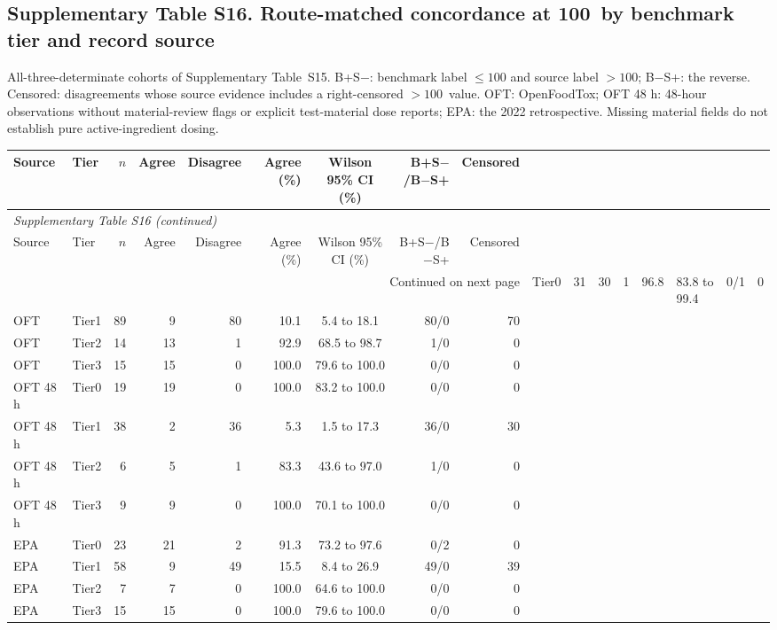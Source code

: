 \subsection*{Supplementary Table S16. Route-matched concordance at 100~\ugbee by benchmark tier and record source}

All-three-determinate cohorts of Supplementary Table~S15. B+S$-$: benchmark label $\leq100$ and source label $>100$; B$-$S+: the reverse. Censored: disagreements whose source evidence includes a right-censored $>100$~\ugbee value. OFT: OpenFoodTox; OFT 48 h: 48-hour observations without material-review flags or explicit test-material dose reports; EPA: the 2022 retrospective. Missing material fields do not establish pure active-ingredient dosing.

\begingroup\footnotesize\setlength{\tabcolsep}{3pt}

\begin{longtable}{llrrrrcrr}

\toprule Source & Tier & $n$ & Agree & Disagree & Agree (\%) & Wilson 95\% CI (\%) & B+S$-$/B$-$S+ & Censored \\ \midrule\endfirsthead

\multicolumn{9}{l}{\textit{Supplementary Table S16 (continued)}} \\

\toprule Source & Tier & $n$ & Agree & Disagree & Agree (\%) & Wilson 95\% CI (\%) & B+S$-$/B$-$S+ & Censored \\ \midrule\endhead

\midrule\multicolumn{9}{r}{Continued on next page}\endfoot\bottomrule\endlastfoot

OFT & Tier0 & 31 & 30 & 1 & 96.8 & 83.8 to 99.4 & 0/1 & 0 \\
OFT & Tier1 & 89 & 9 & 80 & 10.1 & 5.4 to 18.1 & 80/0 & 70 \\
OFT & Tier2 & 14 & 13 & 1 & 92.9 & 68.5 to 98.7 & 1/0 & 0 \\
OFT & Tier3 & 15 & 15 & 0 & 100.0 & 79.6 to 100.0 & 0/0 & 0 \\
OFT 48 h & Tier0 & 19 & 19 & 0 & 100.0 & 83.2 to 100.0 & 0/0 & 0 \\
OFT 48 h & Tier1 & 38 & 2 & 36 & 5.3 & 1.5 to 17.3 & 36/0 & 30 \\
OFT 48 h & Tier2 & 6 & 5 & 1 & 83.3 & 43.6 to 97.0 & 1/0 & 0 \\
OFT 48 h & Tier3 & 9 & 9 & 0 & 100.0 & 70.1 to 100.0 & 0/0 & 0 \\
EPA & Tier0 & 23 & 21 & 2 & 91.3 & 73.2 to 97.6 & 0/2 & 0 \\
EPA & Tier1 & 58 & 9 & 49 & 15.5 & 8.4 to 26.9 & 49/0 & 39 \\
EPA & Tier2 & 7 & 7 & 0 & 100.0 & 64.6 to 100.0 & 0/0 & 0 \\
EPA & Tier3 & 15 & 15 & 0 & 100.0 & 79.6 to 100.0 & 0/0 & 0 \\

\end{longtable}\endgroup

